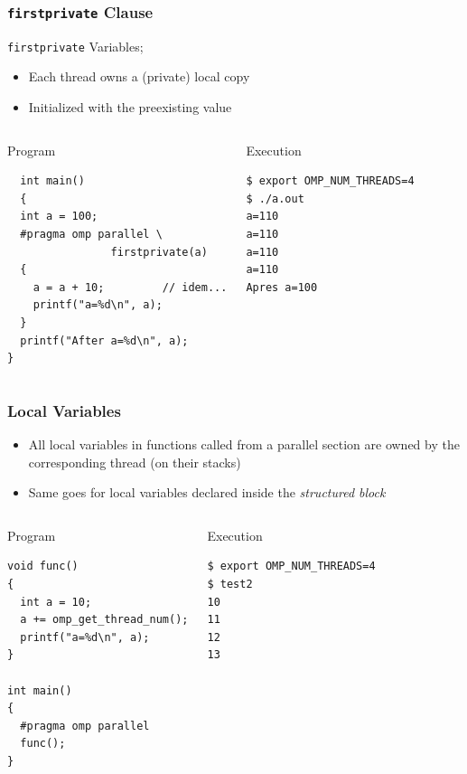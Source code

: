 \documentclass{beamer}
\begin{document}
\begin{frame}[fragile=singleslide]
  \frametitle{\texttt{firstprivate} Clause}
  
   \texttt{firstprivate} Variables;
  \begin{itemize}
  \item Each thread owns a (private) local copy
  \item Initialized with the preexisting value
  \end{itemize}
  
  \begin{columns}[t]
  \column{5cm}
\begin{block}{Program}
\begin{verbatim}
  int main()
  {
  int a = 100;
  #pragma omp parallel \
                firstprivate(a)
  {
    a = a + 10;         // idem...
    printf("a=%d\n", a);
  }
  printf("After a=%d\n", a);
}
\end{verbatim}
\end{block}
    
    
    \column{5cm}
\begin{block}{Execution}    
  \small
\begin{verbatim}
$ export OMP_NUM_THREADS=4
$ ./a.out 
a=110
a=110
a=110
a=110
Apres a=100
\end{verbatim}
\end{block}    
  \end{columns}
\end{frame}


\begin{frame}[fragile=singleslide]
  \frametitle{Local Variables}

  \begin{itemize}
  \item All local variables in functions called from a parallel section are
        owned by the corresponding thread (on their stacks)

  \item Same goes for local variables declared inside the \textit{structured block}
  \end{itemize}

\small
\begin{columns}[t]
  \column[T]{5cm}
\begin{block}{Program}
\begin{verbatim}
void func()
{
  int a = 10;
  a += omp_get_thread_num();
  printf("a=%d\n", a);
}

int main()
{
  #pragma omp parallel 
  func();
}
\end{verbatim}
\end{block}

\column[T]{5cm}
\begin{block}{Execution}
\begin{verbatim}
$ export OMP_NUM_THREADS=4
$ test2
10
11
12
13
\end{verbatim}
\end{block}
\end{columns}
\end{frame}
\end{document}
